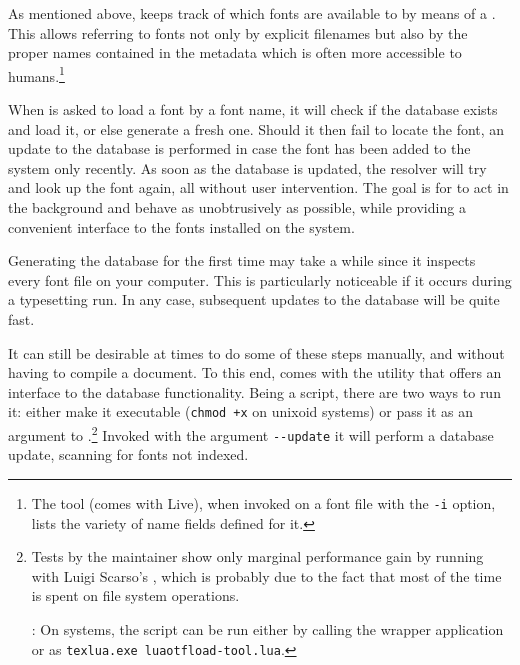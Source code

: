 \endsection


\label{sec:fontdb}

As mentioned above,  keeps track of which
fonts are available to \LUATEX by means of a .
%
This allows referring to fonts not only by explicit filenames but
also by the proper names contained in the metadata which is often
more accessible to humans.\footnote{%
  The tool \href{http://www.lcdf.org/type/}{} (comes
  with \TEX Live), when invoked on a font file with the \verb|-i|
  option, lists the variety of name fields defined for it.
}

When  is asked to load a font by a font name,
it will check if the database exists and load it, or else generate a
fresh one.
%
Should it then fail to locate the font, an update to the database is
performed in case the font has been added to the system only
recently.
%
As soon as the database is updated, the resolver will try
and look up the font again, all without user intervention.
%
The goal is for  to act in the background and
behave as unobtrusively as possible, while providing a convenient
interface to the fonts installed on the system.

Generating the database for the first time may take a while since it
inspects every font file on your computer.
%
This is particularly noticeable if it occurs during a typesetting run.
In any case, subsequent updates to the database will be quite fast.


It can still be desirable at times to do some of these steps
manually, and without having to compile a document.
%
To this end,  comes with the utility
 that offers an interface to the database
functionality.
%
Being a \LUA script, there are two ways to run it:
either make it executable (\verb|chmod +x| on unixoid systems) or
pass it as an argument to .\footnote{%
  Tests by the maintainer show only marginal performance gain by
  running with Luigi Scarso’s
  \href{https://foundry.supelec.fr/projects/luajittex/}%
       {},
  which is probably due to the fact that most of the time is spent
  on file system operations.

  :
  On   systems, the script can be run
  either by calling the wrapper application
   or as
  \verb|texlua.exe luaotfload-tool.lua|.
}
%
Invoked with the argument \verb|--update| it will perform a database
update, scanning for fonts not indexed.

